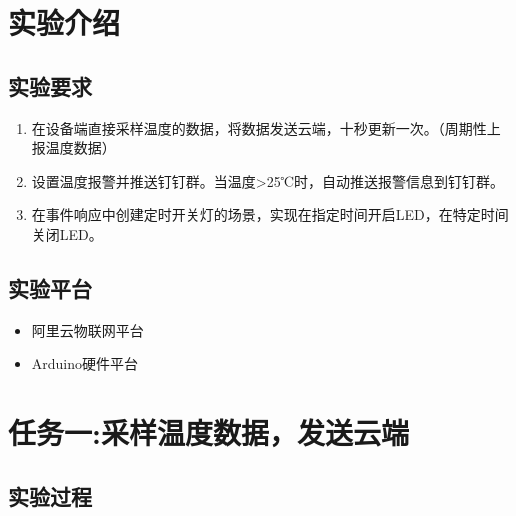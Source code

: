 \documentclass[12pt,hyperref,a4paper,UTF8]{ctexart}
\begin{document}
\cover

%
%

\thispagestyle{empty} %

\newpage
\tableofcontents

\newpage


\section{实验介绍}
\subsection{实验要求}

\begin{enumerate}[itemsep=-5pt, topsep=0pt, partopsep=0pt]
    \item 在设备端直接采样温度的数据，将数据发送云端，十秒更新一次。（周期性上报温度数据）
    \item 设置温度报警并推送钉钉群。当温度>25℃时，自动推送报警信息到钉钉群。
    \item 在事件响应中创建定时开关灯的场景，实现在指定时间开启LED，在特定时间关闭LED。
\end{enumerate}
\subsection{实验平台}
\begin{itemize}[itemsep=-5pt, topsep=0pt, partopsep=0pt]
    \item 阿里云物联网平台
    \item Arduino硬件平台
\end{itemize}


\section{任务一:采样温度数据，发送云端}
\subsection{实验过程}
\end{document}
